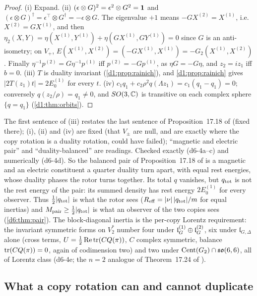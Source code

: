 \begin{proof}
(i) Expand. (ii) $(\epsilon\otimes G)^2=\epsilon^2\otimes G^2=\mathbf 1$ and $(\epsilon\otimes G)^\dagger=\epsilon^{\!\top}\otimes G^\dagger=-\epsilon\otimes G$.
The eigenvalue $+1$ means $-GX^{(2)}=X^{(1)}$, i.e.\ $X^{(2)}=GX^{(1)}$, and then
$\eta_2(X,Y)=\eta(X^{(1)},Y^{(1)})+\eta(GX^{(1)},GY^{(1)})=0$ since $G$ is an anti-isometry; on $V_+$,
$E(X^{(1)},X^{(2)})=(-GX^{(1)},X^{(1)})=-G_2(X^{(1)},X^{(2)})$. Finally $\eta^{-1}p^{(2)}=G\eta^{-1}p^{(1)}$ iff $p^{(2)}=-Gp^{(1)}$, as $\eta G=-G\eta$, and
$z_2=iz_1$ iff $b=0$. (iii) $T$ is duality invariant (\cref{d1:prop:rainich}), and \cref{d1:prop:rainich} gives $|2T(z_1)t|=2E_0^{(1)}$ for
every $t$. (iv) $c_1q_1+c_2\rho^2q(\Lambda z_1)=c_1(q_1-q_1)=0$; conversely $q(z_2/\rho)=q_1\neq0$, and $SO(3,\mathbb{C})$ is transitive on each complex
sphere $\{q=q_1\}$ (\cref{d1:thm:orbits}).
\end{proof}

The first sentence of (iii) restates the last sentence of Proposition~17.18 of \cite{ES17} (fixed there); (i), (ii) and (iv) are fixed (that
$V_\pm$ are null, and are exactly where the copy rotation is a duality rotation, could have failed); ``magnetic and electric pair'' and
``duality-balanced'' are readings. Checked exactly (d6-4a--c) and numerically (d6-4d). So the balanced pair of Proposition~17.18 of \cite{ES17} is
a magnetic and an electric constituent a quarter duality turn apart, with equal rest energies, whose duality phases the rotor turns together.
Its total $q$ vanishes, but $q_{\rm tot}$ is not the rest energy of the pair: its summed density has rest energy $2E_0^{(1)}$ for every
observer. Thus $\tfrac12|q_{\rm tot}|$ is what the rotor sees ($R_{\rm eff}=|\nu|\,|q_{\rm tot}|/m$ for equal inertias) and $M_{\rm pair}\ge\tfrac12|q_{\rm tot}|$ is
what an observer of the two copies sees (\cref{d6:thm:pair}). The block-diagonal inertia is the per-copy Lorentz requirement: the invariant
symmetric forms on $V_2^*$ number four under $\mathfrak l_G^{(1)}\oplus\mathfrak l_G^{(2)}$, six under $\mathfrak l_{G,\Delta}$ alone (cross terms,
$U=\tfrac12\operatorname{Re}\operatorname{tr}(CQ(\pi))$, $C$ complex symmetric, balance $\operatorname{tr}(CQ(\pi))=0$, again of codimension two) and two under $\operatorname{Cent}(G_2)\cap\mathfrak{so}(6,6)$, all of
Lorentz class (d6-4e; the $n=2$ analogue of Theorem~17.24 of \cite{ES17}).

\subsection{What a copy rotation can and cannot duplicate}
\label{d6:sec:covariant}

